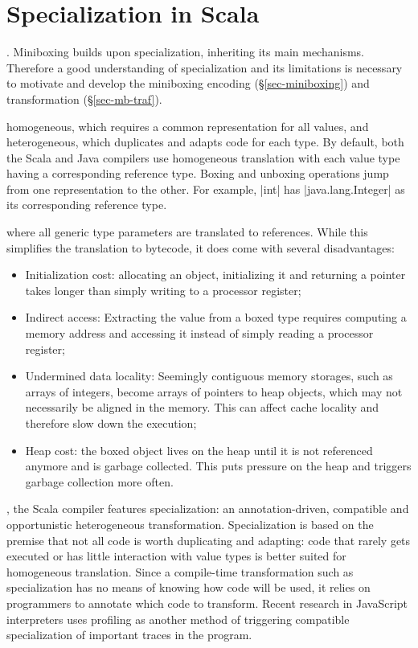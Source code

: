\section{Specialization in Scala}
\label{sec-generics}

. Miniboxing builds upon specialization, inheriting its main mechanisms. Therefore a good understanding of specialization and its limitations is necessary to motivate and develop the miniboxing encoding (\S\ref{sec-miniboxing}) and transformation (\S\ref{sec-mb-traf}).

 homogeneous, which requires a common representation for all values, and heterogeneous, which duplicates and adapts code for each type. By default, both the Scala and Java compilers use homogeneous translation with each value type having a corresponding reference type. Boxing and unboxing operations jump from one representation to the other. For example, |int| has |java.lang.Integer| as its corresponding reference type.

 where all generic type parameters are translated to references. While this simplifies the translation to bytecode, it does come with several disadvantages:
\begin{itemize}
\item Initialization cost: allocating an object, initializing it and returning a pointer takes longer than simply writing to a processor register;
\item Indirect access: Extracting the value from a boxed type requires computing a memory address and accessing it instead of simply reading a processor register;
\item Undermined data locality: Seemingly contiguous memory storages, such as arrays of integers, become arrays of pointers to heap objects, which may not necessarily be aligned in the memory. This can affect cache locality and therefore slow down the execution;
\item Heap cost: the boxed object lives on the heap until it is not referenced anymore and is garbage collected. This puts pressure on the heap and triggers garbage collection more often.
\end{itemize}

, the Scala compiler features specialization: an annotation-driven, compatible and opportunistic heterogeneous transformation. Specialization is based on the premise that not all code is worth duplicating and adapting: code that rarely gets executed or has little interaction with value types is better suited for homogeneous translation. Since a compile-time transformation such as specialization has no means of knowing how code will be used, it relies on programmers to annotate which code to transform. Recent research in JavaScript interpreters \cite{tracemonkey, truffle} uses profiling as another method of triggering compatible specialization of important traces in the program.

